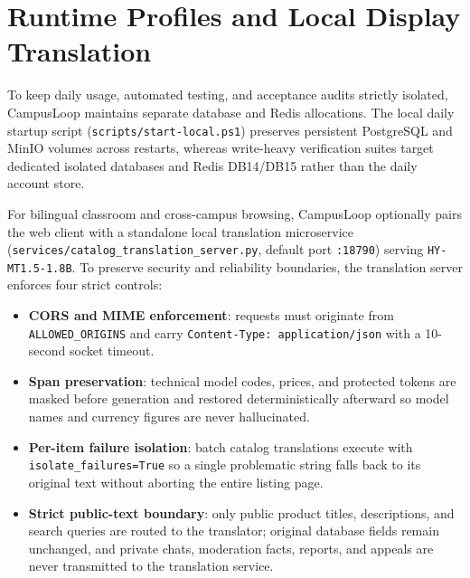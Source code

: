 \section{Runtime Profiles and Local Display Translation}
\label{sec:impl-ops}

To keep daily usage, automated testing, and acceptance audits strictly isolated, CampusLoop maintains separate database and Redis allocations. The local daily startup script (\texttt{scripts/start-local.ps1}) preserves persistent PostgreSQL and MinIO volumes across restarts, whereas write-heavy verification suites target dedicated isolated databases and Redis DB14/DB15 rather than the daily account store.

For bilingual classroom and cross-campus browsing, CampusLoop optionally pairs the web client with a standalone local translation microservice (\texttt{services/\allowbreak catalog\_translation\_\allowbreak server.py}, default port \texttt{:18790}) serving \texttt{HY-MT1.5-1.8B}. To preserve security and reliability boundaries, the translation server enforces four strict controls:
\begin{itemize}
  \item \textbf{CORS and MIME enforcement}: requests must originate from \texttt{ALLOWED\_ORIGINS} and carry \texttt{Content-Type: application/json} with a 10-second socket timeout.
  \item \textbf{Span preservation}: technical model codes, prices, and protected tokens are masked before generation and restored deterministically afterward so model names and currency figures are never hallucinated.
  \item \textbf{Per-item failure isolation}: batch catalog translations execute with \texttt{isolate\_\allowbreak failures=\allowbreak True} so a single problematic string falls back to its original text without aborting the entire listing page.
  \item \textbf{Strict public-text boundary}: only public product titles, descriptions, and search queries are routed to the translator; original database fields remain unchanged, and private chats, moderation facts, reports, and appeals are never transmitted to the translation service.
\end{itemize}
